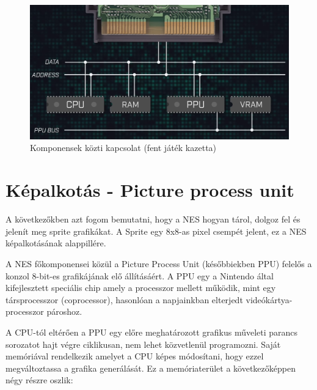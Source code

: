 	\begin{figure}[H]
		\centering
		\includegraphics[width=120mm, keepaspectratio]{figures/NES-databuses}
		\caption{Komponensek közti kapcsolat (fent játék kazetta) \cite{NES_hardware}}
		\label{fig:NES-Data-Buses}
	\end{figure}
	

\section{Képalkotás - Picture process unit}

A következőkben azt fogom bemutatni, hogy a NES hogyan tárol, dolgoz fel és jelenít meg sprite grafikákat. A Sprite egy 8x8-as pixel csempét jelent, ez a NES képalkotásának alappillére.

A NES főkomponensei közül a Picture Process Unit (későbbiekben PPU) felelős a konzol 8-bit-es grafikájának elő állításáért. A PPU egy a Nintendo által kifejlesztett speciális chip amely a processzor mellett működik, mint egy társprocesszor (coprocessor), hasonlóan a napjainkban elterjedt videókártya-processzor pároshoz.

A CPU-tól eltérően a PPU egy előre meghatározott grafikus műveleti parancs sorozatot hajt végre ciklikusan, nem lehet közvetlenül programozni. Saját memóriával rendelkezik
amelyet a CPU képes módosítani, hogy ezzel megváltoztassa a grafika generálását. Ez a memóriaterület a következőképpen négy részre oszlik:

